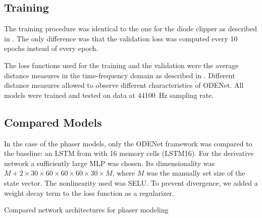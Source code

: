 \subsection{Training}
\label{sec:phaser_training}
The training procedure was identical to the one for the diode clipper as described in . The only difference was that the validation loss was computed every 10 epochs instead of every epoch. 

The loss functions used for the training and the validation were the average distance measures in the time-frequency domain as described in . Different distance measures allowed to observe different characteristics of ODENet. All models were trained and tested on data at \SI{44100}{Hz} sampling rate.


\subsection{Compared Models}
\label{sec:phaser_models}

In the case of the phaser models, only the ODENet framework was compared to the baseline: an \ac{LSTM} from \cite{Wright2020} with 16 memory cells (\ac{LSTM}16). For the derivative network a sufficiently large \ac{MLP} was chosen. Its dimensionality was $M + 2 \times 30 \times 60 \times 60\times 60 \times 30\times M$, where $M$ was the manually set size of the state vector. The nonlinearity used was \ac{SELU}. To prevent divergence, we added a weight decay term to the loss function as a regularizer.

\begin{table}[]
    \caption{Compared network architectures for phaser modeling}
    \centering
    
    \label{tab:phaser_models_data}
\end{table}

